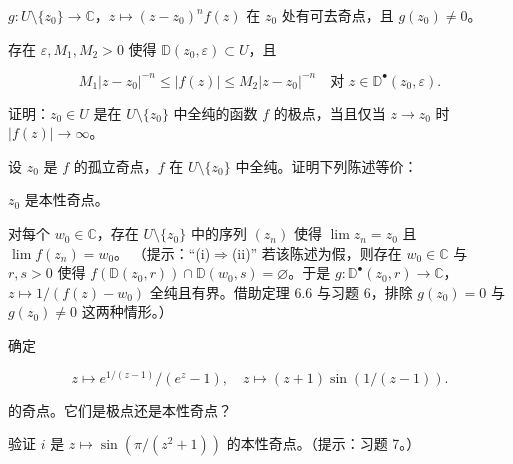 \begin{exercises}
\begin{subitems}
\item

$ g : U\setminus\{z_{0}\} \to \mathbb{C} $，$ z \mapsto (z - z_{0})^{n}f(z) $ 在 $ z_{0} $ 处有可去奇点，且 $ g(z_{0}) \ne 0 $。

\item

存在 $ \varepsilon, M_{1}, M_{2} > 0 $ 使得 $ \mathbb{D}(z_{0},\varepsilon) \subset U $，且

\[
M_{1}\left|z - z_{0}\right|^{-n} \le \left|f(z)\right| \le M_{2}\left|z - z_{0}\right|^{-n} \quad \text{对 } z \in \mathbb{D}^{\bullet}(z_{0},\varepsilon) .
\]
\end{subitems}

\item

证明：$ z_{0} \in U $ 是在 $ U\setminus\{z_{0}\} $ 中全纯的函数 $ f $ 的极点，当且仅当 $ z \to z_{0} $ 时 $ \left|f(z)\right| \to \infty $。

\item

设 $ z_{0} $ 是 $ f $ 的孤立奇点，$ f $ 在 $ U\setminus\{z_{0}\} $ 中全纯。证明下列陈述等价：

\begin{subitems}
\item

$ z_{0} $ 是本性奇点。

\item

对每个 $ w_{0} \in \mathbb{C} $，存在 $ U\setminus\{z_{0}\} $ 中的序列 $ (z_{n}) $ 使得 $ \lim z_{n} = z_{0} $ 且 $ \lim f(z_{n}) = w_{0} $。
（提示：“(i)$\Rightarrow$(ii)” 若该陈述为假，则存在 $ w_{0} \in \mathbb{C} $ 与 $ r, s > 0 $ 使得 $ f(\mathbb{D}(z_{0},r)) \cap \mathbb{D}(w_{0},s) = \varnothing $。于是 $ g : \mathbb{D}^{\bullet}(z_{0},r) \to \mathbb{C} $，$ z \mapsto 1/(f(z) - w_{0}) $ 全纯且有界。借助定理 6.6 与习题 6，排除 $ g(z_{0}) = 0 $ 与 $ g(z_{0}) \ne 0 $ 这两种情形。）

\end{subitems}

\item

确定

\[
z \mapsto e^{1/(z - 1)}/(e^{z} - 1) , \quad z \mapsto (z + 1)\sin(1/(z - 1)) .
\]

的奇点。它们是极点还是本性奇点？

\item

验证 $ i $ 是 $ z \mapsto \sin(\pi/(z^{2} + 1)) $ 的本性奇点。（提示：习题 7。）


\end{exercises}

